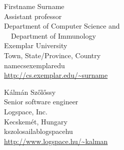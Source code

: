 \begin{tocauthors}
\begin{tocinfo}[surname]
 Firstname Surname\\
 Assistant professor\\
 Department of Computer Science and\\
 \ \ Department of Immunology\\
 Exemplar University\\
 Town, State/Province, Country\\
 name\tocat{}cs\tocdot{}exemplar\tocdot{}edu \\   %
 \url{http://cs.exemplar.edu/~surname}      %
\end{tocinfo}
\begin{tocinfo}[szolossy]
  K\'alm\'an Sz\H{o}l\H{o}ssy\\
  Senior software engineer\\
  Logspace, Inc.\\
  Kecskem\'et, Hungary\\
  kszolos\tocat{}ailab\tocdot{}logspace\tocdot{}hu \\
  \url{http://www.logspace.hu/~kalman}
\end{tocinfo}
\end{tocauthors}

